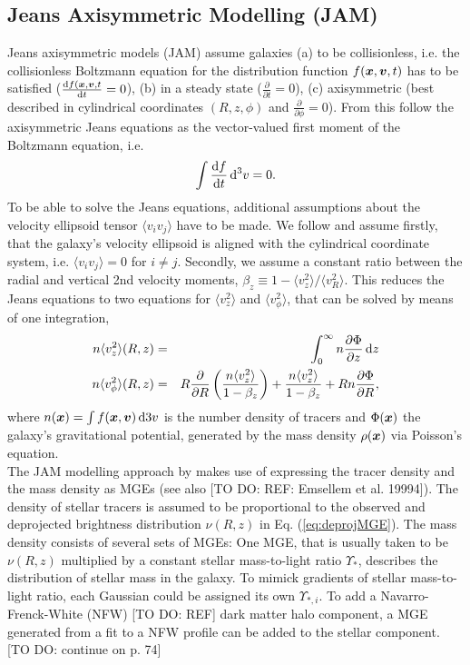 \subsection{Jeans Axisymmetric Modelling (JAM)} \label{sec:model_JAM}

Jeans axisymmetric models (JAM) assume galaxies (a) to be collisionless, i.e. the collisionless Boltzmann equation for the distribution function $f(\boldsymbol{x},\boldsymbol{v},t)$ has to be satisfied ($\frac{\mathop{}\!\mathrm{d} f(\boldsymbol{x},\boldsymbol{v},t}{\mathop{}\!\mathrm{d} t} = 0$), (b) in a steady state ($\frac{\partial}{\partial t} = 0$), (c) axisymmetric (best described in cylindrical coordinates $(R,z,\phi)$ and $\frac{\partial}{\partial \phi} = 0$). From this follow the axisymmetric Jeans equations as the vector-valued first moment of the Boltzmann equation, i.e.
\begin{equation*}
\int \frac{\mathop{}\!\mathrm{d} f}{\mathop{}\!\mathrm{d} t} \mathop{}\!\mathrm{d^3} v = 0.
\end{equation*}
To be able to solve the Jeans equations, additional assumptions about the velocity ellipsoid tensor $\langle v_i v_j\rangle$ have to be made. We follow \citet{Cap08} and assume firstly, that the galaxy's velocity ellipsoid is aligned with the cylindrical coordinate system, i.e. $\langle v_i v_j\rangle = 0$ for $i\neq j$. Secondly, we assume a constant ratio between the radial and vertical 2nd velocity moments, $\beta_z \equiv 1 - \langle v_z^2 \rangle / \langle v_R^2\rangle$. This reduces the Jeans equations to two equations for $\langle v_z^2 \rangle$ and $\langle v_\phi^2 \rangle$, that can be solved by means of one integration,
\begin{eqnarray*}
n \langle v_z^2 \rangle (R,z) &=& \int_0^\infty n \frac{\partial \Phi}{\partial z} \mathop{}\!\mathrm{d} z\\
n \langle v_\phi^2 \rangle (R,z) &=& R \frac{\partial}{\partial R} \left( \frac{n \langle v_z^2 \rangle}{1-\beta_z} \right) + \frac{n \langle v_z^2 \rangle}{1 - \beta_z} + R n \frac{\partial \Phi}{\partial R},
\end{eqnarray*}
where $n(\boldsymbol{x}) = \int f(\boldsymbol{x},\boldsymbol{v}) \mathop{}\!\mathrm{d}3 v$ is the number density of tracers and $\Phi(\boldsymbol{x})$ the galaxy's gravitational potential, generated by the mass density $\rho(\boldsymbol{x})$ via Poisson's equation.
\\The JAM modelling approach by \citet{Cap08} makes use of expressing the tracer density and the mass density as MGEs (see also [TO DO: REF: Emsellem et al. 19994]). The density of stellar tracers is assumed to be proportional to the observed and deprojected brightness distribution $\nu(R,z)$ in Eq. (\ref{eq:deprojMGE}). The mass density consists of several sets of MGEs: One MGE, that is usually taken to be $\nu(R,z)$ multiplied by a constant stellar mass-to-light ratio $\Upsilon_*$, describes the distribution of stellar mass in the galaxy. To mimick gradients of stellar mass-to-light ratio, each Gaussian could be assigned its own $\Upsilon_{*,i}$. To add a Navarro-Frenck-White (NFW) [TO DO: REF] dark matter halo component, a MGE generated from a fit to a NFW profile can be added to the stellar component. [TO DO: continue on p. 74] 


